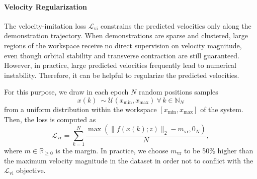 \paragraph{Velocity Regularization}
The velocity-imitation loss $\mathcal{L}_\mathrm{vi}$ constrains the predicted velocities only along the demonstration trajectory. When demonstrations are sparse and clustered, large regions of the workspace receive no direct supervision on velocity magnitude, even though orbital stability and transverse contraction are still guaranteed. However, in practice, large predicted velocities frequently lead to numerical instability. Therefore, it can be helpful to regularize the predicted velocities.

For this purpose, we draw in each epoch $N$ random positions samples 
\begin{equation}
    x(k) ~\sim \mathcal{U}(x_\mathrm{min}, x_\mathrm{max}) \: \forall \, k \in \mathbb{N}_N
\end{equation}
from a uniform distribution within the workspace $[x_\mathrm{min}, x_\mathrm{max}]$ of the system. Then, the loss is computed as
\begin{equation}
    \mathcal{L}_\mathrm{vr} = \sum_{k=1}^N \frac{\max(\lVert f(x(k);z)\rVert_2 - m_\mathrm{vr}, 0_N)}{N},
\end{equation}
where $m \in \mathbb{R}_{\geq0}$ is the margin. In practice, we choose $m_\mathrm{vr}$ to be 50\% higher than the maximum velocity magnitude in the dataset in order not to conflict with the $\mathcal{L}_\mathrm{vi}$ objective.


